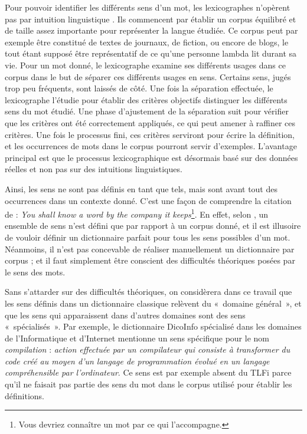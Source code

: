 Pour pouvoir identifier les différents sens d'un mot, les lexicographes
n'opèrent pas par intuition linguistique \citep{kilgarriff1997don}. Ils
commencent par établir un corpus équilibré et de taille assez importante pour
représenter la langue étudiée. Ce corpus peut par exemple être constitué de
textes de journaux, de fiction, ou encore de blogs, le tout étant supposé être
représentatif de ce qu'une personne lambda lit durant sa vie. Pour un mot
donné, le lexicographe examine ses différents usages dans ce corpus dans le but
de séparer ces différents usages en sens. Certains sens, jugés trop peu
fréquents, sont laissés de côté. Une fois la séparation effectuée, le
lexicographe l'étudie pour établir des critères objectifs distinguer les
différents sens du mot étudié. Une phase d'ajustement de la séparation suit
pour vérifier que les critères ont été correctement appliqués, ce qui peut
amener à raffiner ces critères. Une fois le processus fini, ces critères
serviront pour écrire la définition, et les occurrences de mots dans le corpus
pourront servir d'exemples. L'avantage principal est que le processus
lexicographique est désormais basé sur des données réelles et non pas sur des
intuitions linguistiques.


Ainsi, les sens ne sont pas définis en tant que tels, mais sont avant tout des
occurrences dans un contexte donné. C'est une façon de comprendre la citation
de \citep{firth1957synopsys} : \emph{You shall know a word by the company it
keeps}\footnote{Vous devriez connaître un mot par ce qui l'accompagne.}. En
effet, selon \citep{kilgarriff1997don}, un ensemble de sens n'est défini que
par rapport à un corpus donné, et il est illusoire de vouloir définir un
dictionnaire parfait pour tous les sens possibles d'un mot.  Néanmoins, il
n'est pas concevable de réaliser manuellement un dictionnaire par corpus ; et
il faut simplement être conscient des difficultés théoriques posées par le sens
des mots.

Sans s'attarder sur des difficultés théoriques, on considèrera dans ce travail
que les sens définis dans un dictionnaire classique relèvent du «~domaine
général~», et que les sens qui apparaissent dans d'autres domaines sont des
sens «~spécialisés~». Par exemple, le dictionnaire DicoInfo \citep{corpusolst}
spécialisé dans les domaines de l'Informatique et d'Internet mentionne un sens
spécifique pour le nom \emph{compilation} : \emph{action effectuée par un
compilateur qui consiste à transformer du code créé au moyen d'un langage de
programmation évolué en un langage compréhensible par l'ordinateur}. Ce sens
est par exemple absent du TLFi \citep{TLFi} parce qu'il ne faisait pas partie
des sens du mot dans le corpus utilisé pour établir les définitions.

